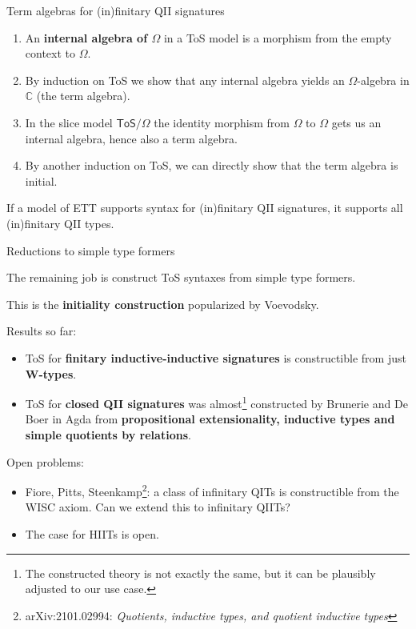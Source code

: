 \documentclass[dvipsnames]{beamer}
\newcommand{\ms}[1]{\mathsf{#1}}
\newcommand{\mbb}[1]{\mathbb{#1}}
\newcommand{\mbbC}{\mbb{C}}
\begin{document}
\begin{frame}{Term algebras for (in)finitary QII signatures}

\begin{enumerate}
\item An \textbf{internal algebra of $\Omega$} in a ToS model is a
      morphism from the empty context to $\Omega$.
\item By induction on ToS we show that any internal algebra yields
      an $\Omega$-algebra in $\mbbC$ (the term algebra).
\item In the slice model $\ms{ToS}/\Omega$ the identity morphism from $\Omega$ to $\Omega$
      gets us an internal algebra, hence also a term algebra.
\item By another induction on ToS, we can directly show that the term algebra
      is initial.
\end{enumerate}
\vspace{1em}

\begin{theorem}
If a model of ETT supports syntax for (in)finitary QII signatures, it supports
all (in)finitary QII types.
\end{theorem}

\end{frame}

\begin{frame}{Reductions to simple type formers}

The remaining job is construct ToS syntaxes from simple type formers.
\vspace{0.5em}

This is the \textbf{initiality construction} popularized by Voevodsky.
\vspace{0.5em}

Results so far:
\begin{itemize}
\item ToS for \textbf{finitary inductive-inductive signatures} is constructible
      from just \textbf{W-types}.
\item ToS for \textbf{closed QII signatures} was almost\footnote{The constructed theory is not exactly the same, but it can be plausibly adjusted to our use case.} constructed by
      Brunerie and De Boer in Agda from \textbf{propositional extensionality, inductive types and
        simple quotients by relations}.
\end{itemize}


Open problems:
\begin{itemize}
\item Fiore, Pitts, Steenkamp\footnote{arXiv:2101.02994: \emph{Quotients, inductive types, and quotient inductive types}}: a class of infinitary QITs is constructible from the WISC axiom.
      Can we extend this to infinitary QIITs?
\item The case for HIITs is open.
\end{itemize}

\end{frame}
\end{document}
